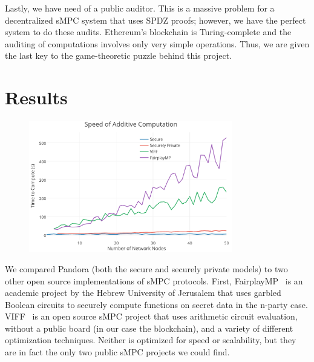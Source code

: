 \documentclass[journal,11pt]{IEEEtran}
\begin{document}
\par Lastly, we have need of a public auditor. This is a massive problem for a decentralized sMPC system that uses SPDZ proofs; however, we have the perfect system to do these audits. Ethereum's blockchain is Turing-complete and the auditing of computations involves only very simple operations. Thus, we are given the last key to the game-theoretic puzzle behind this project.


\section{Results}
\begin{figure}
  \centering
  \includegraphics[width=3.5in]{speedAdd}
  \caption{}
  \label{speedAdd}
\end{figure}
\par We compared Pandora (both the secure and securely private models) to two other open source implementations of sMPC protocols. First, FairplayMP~\cite{Ben-David2008FairplayMP:Computation} is an academic project by the Hebrew University of Jerusalem that uses garbled Boolean circuits to securely compute functions on secret data in the n-party case. VIFF~\cite{Geisler2007VIFF:Framework} is an open source sMPC project that uses arithmetic circuit evaluation, without a public board (in our case the blockchain), and a variety of different optimization techniques. Neither is optimized for speed or scalability, but they are in fact the only two public sMPC projects we could find.
\end{document}
